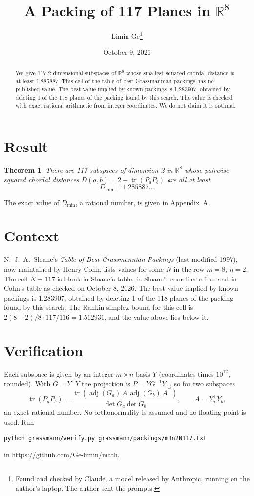 \documentclass[11pt,a4paper]{article}
\title{A Packing of 117 Planes in $\mathbb{R}^{8}$}
\author{Limin Ge\thanks{Found and checked by Claude, a model released by Anthropic, running on the author's laptop. The author sent the prompts.}}
\date{October 9, 2026}
\newtheorem*{theorem}{Theorem}
\begin{document}
\maketitle
\begin{abstract}
We give 117 2-dimensional subspaces of $\mathbb{R}^{8}$ whose smallest squared chordal distance is at least 1.285887. This cell of the table of best Grassmannian packings has no published value. The best value implied by known packings is 1.283907, obtained by deleting 1 of the 118 planes of the packing found by this search. The value is checked with exact rational arithmetic from integer coordinates. We do not claim it is optimal.
\end{abstract}

\section{Result}
\begin{theorem}
There are 117 subspaces of dimension 2 in $\mathbb{R}^{8}$ whose pairwise squared chordal distances $D(a,b) = 2 - \operatorname{tr}(P_aP_b)$ are all at least
\[ D_{\min} = 1.285887\ldots \]
\end{theorem}
The exact value of $D_{\min}$, a rational number, is given in Appendix~A.


\section{Context}
N.~J.~A.~Sloane's \emph{Table of Best Grassmannian Packings} (last modified 1997), now maintained by Henry Cohn, lists values for some $N$ in the row $m=8$, $n=2$. The cell $N=117$ is blank in Sloane's table, in Sloane's coordinate files and in Cohn's table as checked on October 8, 2026. The best value implied by known packings is 1.283907, obtained by deleting 1 of the 118 planes of the packing found by this search. The Rankin simplex bound for this cell is $2(8-2)/8\cdot 117/116 = 1.512931$, and the value above lies below it.


\section{Verification}
Each subspace is given by an integer $m\times n$ basis $Y$ (coordinates times $10^{12}$, rounded). With $G=Y^\top Y$ the projection is $P=YG^{-1}Y^\top$, so for two subspaces
\[ \operatorname{tr}(P_aP_b)=\frac{\operatorname{tr}(\operatorname{adj}(G_a)\,A\,\operatorname{adj}(G_b)\,A^\top)}{\det G_a\det G_b},\qquad A=Y_a^\top Y_b, \]
an exact rational number. No orthonormality is assumed and no floating point is used. Run
\begin{verbatim}
python grassmann/verify.py grassmann/packings/m8n2N117.txt
\end{verbatim}
in \url{https://github.com/Ge-limin/math}.
\end{document}
